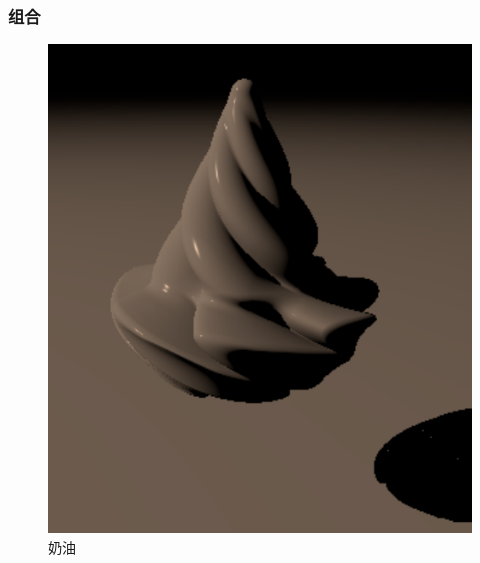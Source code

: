 \documentclass[aspectratio=169]{ctexbeamer} %
\begin{document}
\begin{frame}
    \frametitle{组合}
    \begin{figure}[htbp]
        \centering
        \includegraphics[height=.75\textheight]{images/pre/head/cream.pdf}
        \caption{奶油}
        \label{fig:cream}
    \end{figure}
\end{frame}
\end{document}
